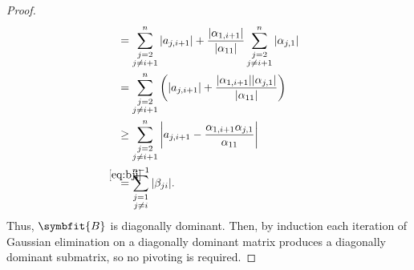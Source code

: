 \documentclass{article}
\theoremstyle{definition}
\newcommand{\mat}[1]{\symbfit{#1}}
\begin{document}
\begin{enumerate}[leftmargin=\labelsep]
\begin{proof}
{\begin{align*}
					                       & = \sum_{\substack{j=2\\j\neq i+1}}^n \abs{a_{j,i+1}} + \frac{\abs{\alpha_{1,i+1}}}{\abs{\alpha_{11}}} \sum_{\substack{j=2\\j\neq i+1}}^n \abs{\alpha_{j,1}}                                                                                                         \\
					                       & = \sum_{\substack{j=2\\j\neq i+1}}^n \qty(\abs{a_{j,i+1}} + \frac{\abs{\alpha_{1,i+1}}\abs{\alpha_{j,1}}}{\abs{\alpha_{11}}})                                                                                                                                       \\
					                       & \geq \sum_{\substack{j=2\\j\neq i+1}}^n \vqty{a_{j,i+1} - \frac{\alpha_{1,i+1}\alpha_{j,1}}{\alpha_{11} }}                                                                                                                                                          \\
					                       & \stackrel{\mathclap{\eqref{eq:bji}}}{=}  \sum_{\substack{j=1\\j\neq i}}^{n-1} \abs{\beta_{ji}}.                                                                                                                                                                     \\
				      \end{align*}}
		      Thus, \(\mat{B}\) is diagonally dominant. Then, by induction each iteration of Gaussian elimination on a diagonally dominant matrix produces a diagonally dominant submatrix, so no pivoting is required.
	      \end{proof}


\end{enumerate}
\end{document}

